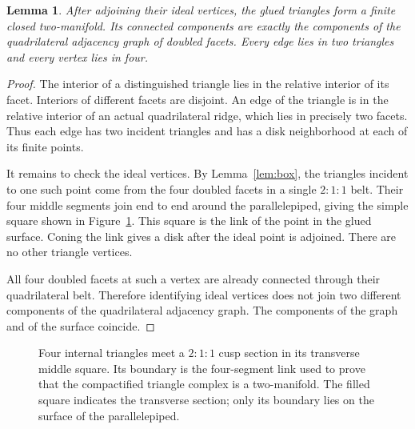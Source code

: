 \documentclass[11pt]{article}
\newtheorem{lemma}[theorem]{Lemma}
\theoremstyle{remark}
\begin{document}
\begin{lemma}\label{lem:surface}
After adjoining their ideal vertices, the glued triangles form a
finite closed two-manifold. Its connected components are exactly
the components of the quadrilateral adjacency graph of doubled facets.
Every edge lies in two triangles and every vertex lies in four.
\end{lemma}
\begin{proof}
The interior of a distinguished triangle lies in the relative
interior of its facet. Interiors of different facets are disjoint.
An edge of the triangle is in the relative interior of an actual
quadrilateral ridge, which lies in precisely two facets. Thus each
edge has two incident triangles and has a disk neighborhood at
each of its finite points.

It remains to check the ideal vertices. By Lemma~\ref{lem:box},
the triangles incident to one such point come from the four doubled
facets in a single $2:1:1$ belt. Their four middle segments join
end to end around the parallelepiped, giving the simple square shown in
Figure~\ref{fig:belt}. This square is the link of the point in the glued surface.
Coning the link gives a disk after the ideal point is adjoined.
There are no other triangle vertices.

All four doubled facets at such a vertex are already connected
through their quadrilateral belt. Therefore identifying ideal
vertices does not join two different components of the quadrilateral
adjacency graph. The components of the graph and of the surface
coincide.
\end{proof}

\begin{figure}[htbp]
\centering
{}
\caption{Four internal triangles meet a $2:1:1$ cusp section
in its transverse middle square. Its boundary is the four-segment
link used to prove that the compactified triangle complex is a
two-manifold. The filled square indicates the transverse section;
only its boundary lies on the surface of the parallelepiped.}
\label{fig:belt}
\end{figure}
\end{document}
